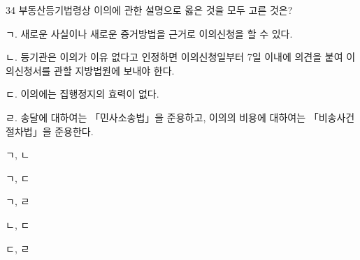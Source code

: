 \begin{question}{34}
부동산등기법령상 이의에 관한 설명으로 옳은 것을 모두 고른 것은?
\begin{framedtext}
ㄱ. 새로운 사실이나 새로운 증거방법을 근거로 이의신청을 할 수 있다. \par
ㄴ. 등기관은 이의가 이유 없다고 인정하면 이의신청일부터 7일 이내에 의견을 붙여 이의신청서를 관할 지방법원에 보내야 한다. \par
ㄷ. 이의에는 집행정지의 효력이 없다. \par
ㄹ. 송달에 대하여는 「민사소송법」을 준용하고, 이의의 비용에 대하여는 「비송사건절차법」을 준용한다. \par
\end{framedtext}
\begin{choices}
  \item ㄱ, ㄴ
  \item ㄱ, ㄷ
  \item ㄱ, ㄹ
  \item ㄴ, ㄷ
  \item ㄷ, ㄹ
\end{choices}
\end{question}

